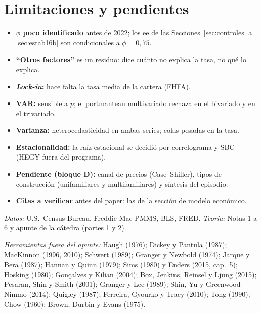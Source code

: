 \documentclass[11pt,a4paper]{article}
\begin{document}
\section{Limitaciones y pendientes}
\begin{itemize}
\item \textbf{$\phi$ poco identificado} antes de 2022; los ee de las Secciones~\ref{sec:controles} a \ref{sec:estab16b} son condicionales a $\phi=0{,}75$.
\item \textbf{``Otros factores''} es un residuo: dice cu\'anto no explica la tasa, no qu\'e lo explica.
\item \textbf{\emph{Lock-in}:} hace falta la tasa media de la cartera (FHFA).
\item \textbf{VAR:} sensible a $p$; el portmanteau multivariado rechaza en el bivariado y en el trivariado.
\item \textbf{Varianza:} heterocedasticidad en ambas series; colas pesadas en la tasa.
\item \textbf{Estacionalidad:} la ra\'iz estacional se decidi\'o por correlograma y SBC (HEGY fuera del programa).
\item \textbf{Pendiente (bloque D):} canal de precios (Case--Shiller), tipos de construcci\'on (unifamiliares y multifamiliares) y s\'intesis del episodio.
\item \textbf{Citas a verificar} antes del paper: las de la secci\'on de modelo econ\'omico.
\end{itemize}

\medskip\noindent\textit{Datos:} U.S.\ Census Bureau, Freddie Mac PMMS, BLS, FRED. \textit{Teor\'ia:} Notas 1 a 6 y apunte de la c\'atedra (partes 1 y 2).

\medskip\noindent\textit{Herramientas fuera del apunte:} Haugh (1976); Dickey y Pantula (1987); MacKinnon (1996, 2010); Schwert (1989); Granger y Newbold (1974); Jarque y Bera (1987); Hannan y Quinn (1979); Sims (1980) y Enders (2015, cap.~5); Hosking (1980); Gon\c{c}alves y Kilian (2004); Box, Jenkins, Reinsel y Ljung (2015); Pesaran, Shin y Smith (2001); Granger y Lee (1989); Shin, Yu y Greenwood-Nimmo (2014); Quigley (1987); Ferreira, Gyourko y Tracy (2010); Tong (1990); Chow (1960); Brown, Durbin y Evans (1975).

\appendix
\end{document}

